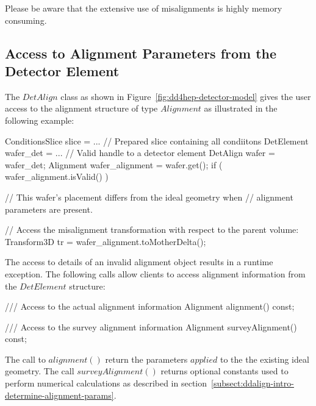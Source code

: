 \documentclass[10pt,a4paper]{article}
\begin{document}
\noindent
Please be aware that the extensive use of misalignments is highly memory
consuming.

\noindent
\subsection{Access to Alignment Parameters from the Detector Element}
\label{sec:ddalign-user-manual-misalignment-access}

\noindent
The $DetAlign$ class as shown in Figure~\ref{fig:dd4hep-detector-model}
gives the user access to the alignment structure of type $Alignment$ as 
illustrated in the following example:
\begin{code}
    ConditionsSlice slice = ...  // Prepared slice containing all condiitons
    DetElement wafer_det  = ...  // Valid handle to a detector element
    DetAlign   wafer = wafer_det;
    Alignment  wafer_alignment = wafer.get();
    if ( wafer_alignment.isValid() )  {
        // This wafer's placement differs from the ideal geometry when
        // alignment parameters are present.
        
        // Access the misalignment transformation with respect to the parent volume:
        Transform3D tr = wafer_alignment.toMotherDelta();
    }
\end{code}
The access to details of an invalid alignment object results in a runtime 
exception. The following calls allow clients to access alignment information
from the $DetElement$ structure:
\begin{code}
      /// Access to the actual alignment information
      Alignment alignment() const;

      /// Access to the survey alignment information
      Alignment surveyAlignment() const;
\end{code}
The call to $alignment()$ return the parameters $applied$ to the the existing
ideal geometry. The call $surveyAlignment()$ returns optional constants used 
to perform numerical calculations as described in 
section~\ref{subsect:ddalign-intro-determine-alignment-params}.
\end{document}
